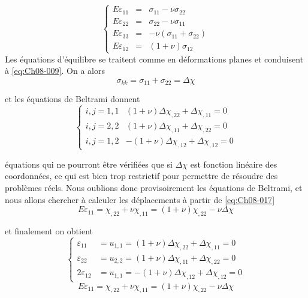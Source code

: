 \begin{equation}
  \begin{cases}
    E \varepsilon_{11} & = & \sigma_{11}-\nu\sigma_{22}\\
    E \varepsilon_{22} & = & \sigma_{22}-\nu\sigma_{11}\\
    E \varepsilon_{33} & = & -\nu (\sigma_{11}+\sigma_{22})\\
    E \varepsilon_{12} & = & (1+\nu)\sigma_{12}
  \end{cases}
\label{eq:Ch08-017}
\end{equation}
Les équations d'équilibre se traitent comme en déformations planes et con­duisent à \eqref{eq:Ch08-009}. 
On a alors 
\begin{equation}
  \sigma_{kk}=\sigma_{11}+\sigma_{22}=\Delta\chi
\label{eq:Ch08-018}
\end{equation}

et les équations de Beltrami donnent 
\begin{equation}
  \begin{cases}
    i,j=1,1  &  (1+\nu) \Delta\chi_{,22}+\Delta\chi_{,11} = 0\\
    i,j=2,2  &  (1+\nu) \Delta\chi_{,11}+\Delta\chi_{,22} = 0\\
    i,j=1,2  & -(1+\nu) \Delta\chi_{,12}+\Delta\chi_{,12} = 0
  \end{cases}
\label{eq:Ch08-019}
\end{equation}

équations qui ne pourront être vérifiées que si $\Delta\chi$ est fonction linéaire des coordonnées, ce qui est bien trop restrictif pour permettre de résoudre des problèmes réels.
Nous oublions donc provisoirement les équations de Bel­trami, et nous allons chercher à calculer les déplacements à partir de \eqref{eq:Ch08-017} 
\begin{equation*}
  E\varepsilon_{11}=\chi_{,22}+\nu\chi_{,11}=(1+\nu)\chi_{,22}-\nu\Delta\chi
\end{equation*}

et finalement on obtient 
\begin{equation}
  \begin{cases}
    \varepsilon_{11}   &  = u_{1,1} = (1+\nu) \Delta\chi_{,22}+\Delta\chi_{,11} = 0\\
    \varepsilon_{22}   &  = u_{2,2} =   (1+\nu) \Delta\chi_{,11}+\Delta\chi_{,22} = 0\\
    2\varepsilon_{12}  &  = u_{1,1} =  -(1+\nu) \Delta\chi_{,12}+\Delta\chi_{,12} = 0
  \end{cases}
\label{eq:Ch08-020}
\end{equation}
\begin{equation*}
  E\varepsilon_{11}=\chi_{,22}+\nu\chi_{,11}=(1+\nu)\chi_{,22}-\nu\Delta\chi
\label{eq:Ch08-021}
\end{equation*}


